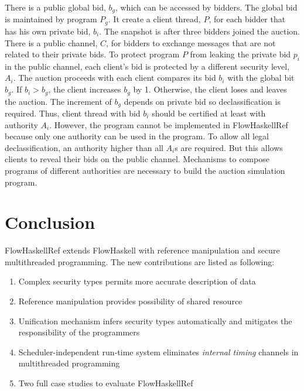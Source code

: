 \documentclass{report}
\begin{document}
There is a public global bid, $b_g$, which can be accessed by bidders. 
The global bid is maintained by program $P_g$. It create a client thread, $P$, for each 
bidder that has his own private bid, $b_i$.
The snapshot is after three bidders joined the auction. 
There is a public channel, $C$, for bidders to exchange messages that are not related to their private bids.
To protect program $P$ from leaking the private bid $p_i$ in the public channel, each client's bid is protected
by a different security level, $A_i$.  
The auction proceeds with each client compares its bid $b_i$ with the global bit $b_g$.
If $b_i>b_g$, the client increases $b_g$ by 1. Otherwise, the client loses and leaves the auction.
The increment of $b_g$ depends on private bid so declassification is required.
Thus, client thread with bid $b_i$ should be certified at least with authority $A_i$.
However, the program cannot be implemented in FlowHaskellRef because only one authority can be used in
the program. To allow all legal declassification, an authority higher than all $A_i$s are required.
But this allows clients to reveal their bids on the public channel.
Mechanisms to compose programs of different authorities are necessary to build the auction simulation program.


\section{Conclusion}
FlowHaskellRef extends FlowHaskell with reference manipulation and secure multithreaded programming.
The new contributions are listed as following:
\begin{enumerate}
\item Complex security types permits more accurate description of data
\item Reference manipulation provides possibility of shared resource
\item Unification mechanism infers security types automatically and mitigates the responsibility of the programmers
\item Scheduler-independent run-time system eliminates {\em internal timing} channels in multithreaded programming
\item Two full case studies to evaluate FlowHaskellRef
\end{enumerate}
\end{document}
